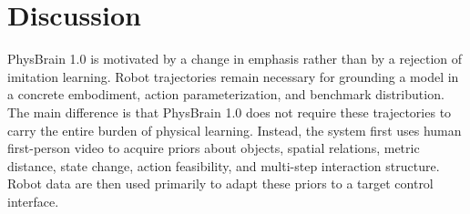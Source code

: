 \documentclass{llmxive}
\providecommand{\todo}[1]{}
\begin{document}





\section{Discussion}
\label{sec:discussion}

PhysBrain 1.0 is motivated by a change in emphasis rather than by a rejection of imitation learning. Robot trajectories remain necessary for grounding a model in a concrete embodiment, action parameterization, and benchmark distribution. The main difference is that PhysBrain 1.0 does not require these trajectories to carry the entire burden of physical learning. Instead, the system first uses human first-person video to acquire priors about objects, spatial relations, metric distance, state change, action feasibility, and multi-step interaction structure. Robot data are then used primarily to adapt these priors to a target control interface.
\end{document}
